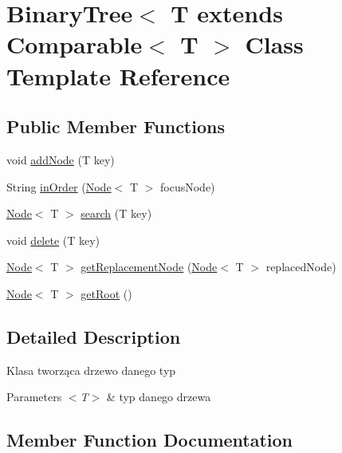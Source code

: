 \hypertarget{classBinaryTree}{}\section{Binary\+Tree$<$ T extends Comparable$<$ T $>$ Class Template Reference}
\label{classBinaryTree}
\subsection*{Public Member Functions}
\begin{DoxyCompactItemize}
\item 
void \hyperlink{classBinaryTree_a3c178b00a189f2384f872445d0650eba}{add\+Node} (T key)
\item 
String \hyperlink{classBinaryTree_a77eb76ed2fa0ca744cafc1863ca37903}{in\+Order} (\hyperlink{classNode}{Node}$<$ T $>$ focus\+Node)
\item 
\hyperlink{classNode}{Node}$<$ T $>$ \hyperlink{classBinaryTree_aa5345ff34f14685521f16e82d8ccf92b}{search} (T key)
\item 
void \hyperlink{classBinaryTree_ae1477b6a8cd79043d89cca9caa23a65d}{delete} (T key)
\item 
\hyperlink{classNode}{Node}$<$ T $>$ \hyperlink{classBinaryTree_af517213208f68c8d05d4c948fe2e99bd}{get\+Replacement\+Node} (\hyperlink{classNode}{Node}$<$ T $>$ replaced\+Node)
\item 
\hyperlink{classNode}{Node}$<$ T $>$ \hyperlink{classBinaryTree_a418ad03908efabbf2e7d271810bba07c}{get\+Root} ()
\end{DoxyCompactItemize}


\subsection{Detailed Description}
Klasa tworząca drzewo danego typ 
\begin{DoxyParams}{Parameters}
{\em $<$\+T$>$} & typ danego drzewa \\
\hline
\end{DoxyParams}


\subsection{Member Function Documentation}
\mbox{\label{classBinaryTree_a3c178b00a189f2384f872445d0650eba}} 
